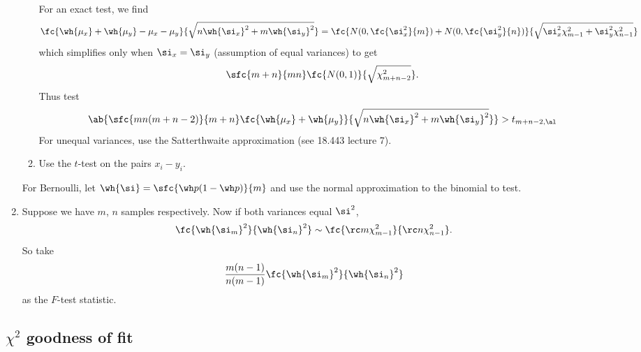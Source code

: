 \begin{enumerate}
\begin{enumerate}
For an exact test, we find
\[
\fc{\wh{\mu_x}+\wh{\mu_y}-\mu_x-\mu_y}{\sqrt{n\wh{\si_x}^2+m\wh{\si_y}^2}} = \fc{N(0,\fc{\si_x^2}{m})+N(0,\fc{\si_y^2}{n})}{\sqrt{\si_x^2\chi_{m-1}^2+\si_y^2\chi_{n-1}^2}}
\]
which simplifies only when $\si_x=\si_y$ (assumption of equal variances) to get
\[
\sfc{m+n}{mn}\fc{N(0,1)}{\sqrt{\chi_{m+n-2}^2}}.
\]
Thus test
\[
\ab{\sfc{mn(m+n-2)}{m+n}\fc{\wh{\mu_x}+\wh{\mu_y}}{\sqrt{n\wh{\si_x}^2+m\wh{\si_y}^2}}}>t_{m+n-2,\al}
\]
For unequal variances, use the Satterthwaite approximation (see 18.443 lecture 7).
\item
Use the $t$-test on the pairs $x_i-y_i$.
\end{enumerate}
For Bernoulli, let $\wh{\si}=\sfc{\wh p (1-\wh p)}{m}$ and use the normal approximation to the binomial to test.
\item
Suppose we have $m$, $n$ samples respectively. Now if both variances equal $\si^2$,
\[
\fc{\wh{\si_m}^2}{\wh{\si_n}^2}\sim \fc{\rc m\chi_{m-1}^2}{\rc n\chi_{n-1}^2}.
\]
So take
\[
\frac{m(n-1)}{n(m-1)}\fc{\wh{\si_m}^2}{\wh{\si_n}^2}
\]
as the $F$-test statistic.
\end{enumerate}
\subsection{$\chi^2$ goodness of fit}


